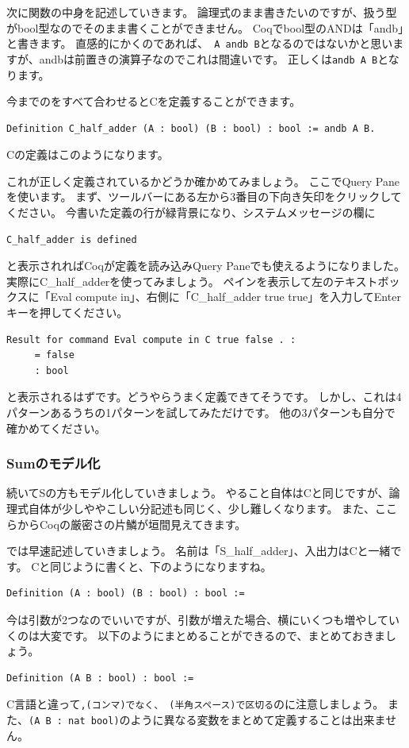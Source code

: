 \documentclass{jsbook}
\begin{document}
次に関数の中身を記述していきます。
論理式のまま書きたいのですが、扱う型がbool型なのでそのまま書くことができません。
Coqでbool型のANDは「andb」と書きます。
直感的にかくのであれば、\verb| A andb B|となるのではないかと思いますが、andbは前置きの演算子なのでこれは間違いです。
正しくは\verb|andb A B|となります。

今までのをすべて合わせるとCを定義することができます。
\begin{verbatim}
Definition C_half_adder (A : bool) (B : bool) : bool := andb A B.
\end{verbatim}
Cの定義はこのようになります。

これが正しく定義されているかどうか確かめてみましょう。
ここでQuery Paneを使います。
まず、ツールバーにある左から3番目の下向き矢印をクリックしてください。
今書いた定義の行が緑背景になり、システムメッセージの欄に
\begin{verbatim}
C_half_adder is defined
\end{verbatim}
と表示されればCoqが定義を読み込みQuery Paneでも使えるようになりました。
実際にC\_half\_adderを使ってみましょう。
ペインを表示して左のテキストボックスに「Eval compute in」、右側に「C\_half\_adder true true」を入力してEnterキーを押してください。

\begin{verbatim}
Result for command Eval compute in C true false . :
     = false
     : bool
\end{verbatim}
と表示されるはずです。どうやらうまく定義できてそうです。
しかし、これは4パターンあるうちの1パターンを試してみただけです。
他の3パターンも自分で確かめてください。
\subsubsection*{Sumのモデル化}
続いてSの方もモデル化していきましょう。
やること自体はCと同じですが、論理式自体が少しややこしい分記述も同じく、少し難しくなります。
また、ここらからCoqの厳密さの片鱗が垣間見えてきます。

では早速記述していきましょう。
名前は「S\_half\_adder」、入出力はCと一緒です。
Cと同じように書くと、下のようになりますね。
\begin{verbatim}
Definition (A : bool) (B : bool) : bool :=
\end{verbatim}
今は引数が2つなのでいいですが、引数が増えた場合、横にいくつも増やしていくのは大変です。
以下のようにまとめることができるので、まとめておきましょう。
\begin{verbatim}
Definition (A B : bool) : bool :=
\end{verbatim}
C言語と違って\verb*|,(コンマ)でなく、 (半角スペース)で区切る|のに注意しましょう。
また、\verb|(A B : nat bool)|のように異なる変数をまとめて定義することは出来ません。
\end{document}
